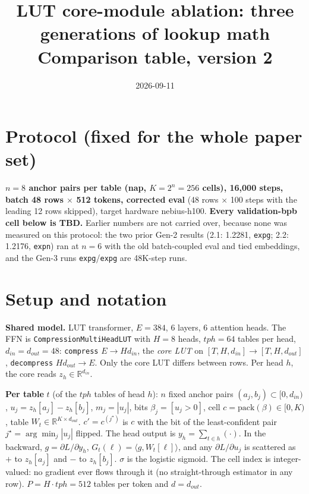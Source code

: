 \documentclass[10pt]{article}
\title{LUT core-module ablation: three generations of lookup math\\[2pt]
\large Comparison table, version 2}
\date{2026-09-11}
\author{}
\newcommand{\code}[1]{{\renewcommand{\_}{\textunderscore\allowbreak}\texttt{#1}}}
\begin{document}
\maketitle
\vspace{-2.5em}

\section*{Protocol (fixed for the whole paper set)}
\textbf{$n=8$ anchor pairs per table (nap, $K=2^n=256$ cells), 16{,}000 steps, batch 48 rows $\times$ 512 tokens, corrected eval}
(48 rows $\times$ 100 steps with the leading 12 rows skipped), target hardware nebius-h100.
\textbf{Every validation-bpb cell below is TBD.} Earlier numbers are not carried over, because none was measured on this protocol:
the two prior Gen-2 results (2.1: 1.2281, \code{exp\_g\_0014}; 2.2: 1.2176, \code{exp\_n\_0044}) ran at $n=6$ with the old
batch-coupled eval and tied embeddings, and the Gen-3 runs \code{exp\_g\_0207}/\code{exp\_g\_0206} are 48K-step runs.

\section*{Setup and notation}
\textbf{Shared model.} LUT transformer, $E=384$, 6 layers, 6 attention heads. The FFN is
\code{CompressionMultiHeadLUT} with $H=8$ heads, $tph=64$ tables per head, $d_{in}=d_{out}=48$:
\code{compress} $E\to H d_{in}$, the \emph{core LUT} on $[T,H,d_{in}]\to[T,H,d_{out}]$, \code{decompress}
$H d_{out}\to E$. Only the core LUT differs between rows. Per head $h$, the core reads $z_h\in\mathbb R^{d_{in}}$.

\textbf{Per table} $t$ (of the $tph$ tables of head $h$): $n$ fixed anchor pairs $(a_j,b_j)\subset[0,d_{in})$,
$u_j=z_h[a_j]-z_h[b_j]$, $m_j=|u_j|$, bits $\beta_j=[u_j>0]$, cell $c=\mathrm{pack}(\beta)\in[0,K)$,
table $W_t\in\mathbb R^{K\times d_{out}}$. $c'=c^{(j^\star)}$ is $c$ with the bit of the least-confident pair
$j^\star=\arg\min_j|u_j|$ flipped. The head output is $y_h=\sum_{t\in h}(\cdot)$.
In the backward, $g=\partial L/\partial y_h$, $G_t(\ell)=\langle g,W_t[\ell]\rangle$, and any
$\partial L/\partial u_j$ is scattered as $+$ to $z_h[a_j]$ and $-$ to $z_h[b_j]$. $\sigma$ is the logistic sigmoid.
The cell index is integer-valued: no gradient ever flows through it (no straight-through estimator in any row).
$P=H\cdot tph=512$ tables per token and $d=d_{out}$.
\end{document}

